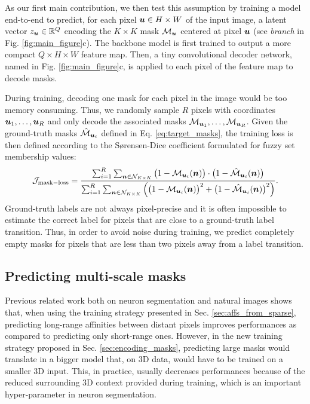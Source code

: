 As our first main contribution, we then test this assumption by training a model end-to-end to predict, for each pixel $\bm{u}\in H\times W$ of the input image, a latent vector $z_{\bm{u}}\in \mathbb{R}^Q$ encoding the $K \times K$ \maskname mask $\mathcal{M}_{\bm{u}}$ centered at pixel $\bm{u}$ (see \emph{\encBr branch} in Fig. \ref{fig:main_figure}c). 
The backbone model is first trained to output a more compact $Q\times H\times W$ feature map. 
Then, a tiny convolutional decoder network, named \emph{\maskDec} in Fig. \ref{fig:main_figure}c, is applied to each pixel of the feature map to decode masks.

During training, decoding one mask for each pixel in the image would be too memory consuming. Thus, we randomly sample $R$ pixels with coordinates $\bm{u}_1, \ldots, \bm{u}_R$ and only decode the associated masks $\mathcal{M}_{\bm{u}_1}, \ldots, \mathcal{M}_{\bm{u}_R}$. 
Given the ground-truth \maskname masks $\hat{\mathcal{M}}_{\bm{u}_i}$ defined in Eq. \ref{eq:target_masks}, the training loss is then defined according to the S\o rensen-Dice coefficient formulated for fuzzy set membership values:
\begin{equation}
\mathcal{J}_{\mathrm{mask-loss}} = \frac{\sum_{i=1}^R \sum_{\bm{n} \in \mathcal{N}_{K\times K}} \big(1-\mathcal{M}_{\bm{u}_i}(\bm{n})\big)\cdot \big(1-\hat{\mathcal{M}}_{\bm{u}_i}(\bm{n})\big)}{\sum_{i=1}^R \sum_{\bm{n}\in \mathcal{N}_{K\times K}} \Big( \big(1-\mathcal{M}_{\bm{u}_i}(\bm{n})\big)^2 + \big(1-\hat{\mathcal{M}}_{\bm{u}_i}(\bm{n})\big)^2 \Big)}.
\end{equation} 
Ground-truth labels are not always pixel-precise and it is often impossible to estimate the correct label for pixels that are close to a ground-truth label transition. Thus, in order to avoid noise during training, we predict completely empty masks for pixels that are less than two pixels away from a label transition. 


\subsection{Predicting multi-scale \maskname masks}\label{sec:multiscale_patches}
Previous related work both on neuron segmentation \cite{lee2017superhuman} and natural images \cite{liu2018affinity,Gao_2019_ICCV} shows that, when using the training strategy presented in Sec. \ref{sec:affs_from_sparse}, predicting long-range affinities between distant pixels improves performances as compared to predicting only short-range ones. However, in the new training strategy proposed in Sec. \ref{sec:encoding_masks}, predicting large \maskname masks would translate in a bigger model that, on 3D data, would have to be trained on a smaller 3D input.
This, in practice, usually decreases performances because of the reduced surrounding 3D context provided during training, which is an important hyper-parameter in neuron segmentation.

